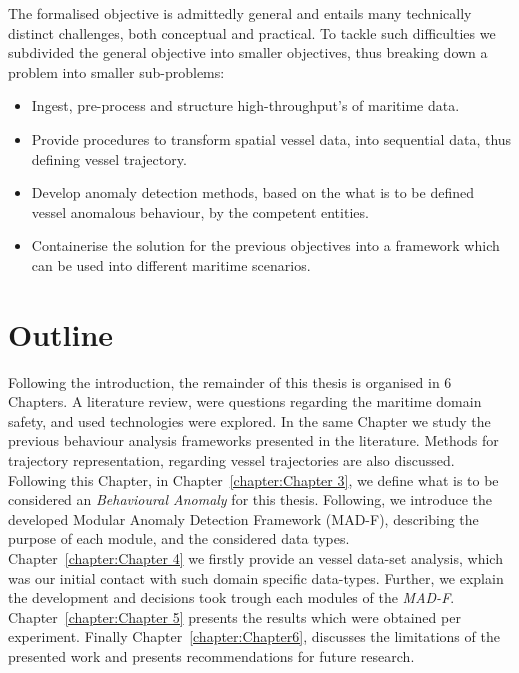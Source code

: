 The formalised objective is admittedly general and entails many technically distinct challenges, both conceptual and practical. To tackle such difficulties we subdivided the general objective into smaller objectives, thus breaking down a problem into smaller sub-problems: 

\begin{itemize}
\item Ingest, pre-process and structure high-throughput's of maritime data.
\item Provide procedures to transform spatial vessel data, into sequential data, thus defining vessel trajectory.
\item Develop anomaly detection methods, based on the what is to be defined vessel anomalous behaviour, by the competent entities.
\item Containerise the solution for the previous objectives into a framework which can be used into different maritime scenarios.  
\end{itemize}

\section{Outline}
Following the introduction, the remainder of this thesis is organised in 6 Chapters. A literature review, were questions regarding the maritime domain safety, and used technologies were explored. In the same Chapter we study the previous behaviour analysis frameworks presented in the literature. Methods for trajectory representation, regarding vessel trajectories are also discussed. Following this Chapter, in Chapter~\ref{chapter:Chapter 3}, we define what is to be considered an \emph{Behavioural Anomaly} for this thesis. Following, we introduce the developed Modular Anomaly Detection Framework (MAD-F), describing the purpose of each module, and the considered data types. Chapter~\ref{chapter:Chapter 4} we firstly provide an vessel data-set analysis, which was our initial contact with such domain specific data-types. Further, we explain the development and decisions took trough each modules of the \emph{MAD-F}. Chapter~\ref{chapter:Chapter 5} presents the results which were obtained per experiment. Finally Chapter~\ref{chapter:Chapter6}, discusses the limitations of the presented work and presents recommendations for future research.

